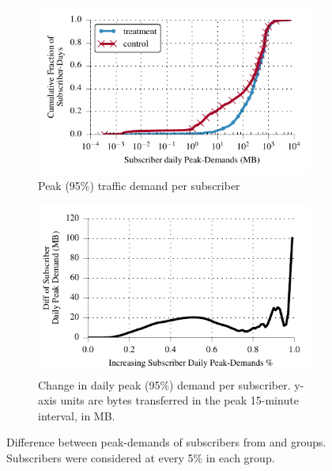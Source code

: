 \begin{figure}[t]
\begin{minipage}{\linewidth}
\centering
\begin{subfigure}[b]{.49\linewidth}
 \includegraphics[width=\linewidth]{figures/cdf_peak_demand-daily.pdf}
                \caption{Peak (95\%) traffic demand per subscriber\label{fig:CDF-data-rate-daily-perc95}}
 \end{subfigure}
\begin{subfigure}[b]{.49\linewidth}
\includegraphics[width=\linewidth]{figures/diff_perc95_bytes_subsc-daily-overall_01.pdf}		%
                \caption{Change in daily peak (95\%) demand per subscriber. 
		  y-axis units are bytes transferred in the peak 15-minute
                  interval, in MB.\label{fig:diff-peak-daily}} 
\end{subfigure}
%
\end{minipage}
  \caption{Difference between peak-demands of subscribers from \treatment{} and
  \control{} groups. Subscribers were considered at every 5\% in each
  group. 
  \label{fig:traffic-demand-daily}}
\end{figure}


